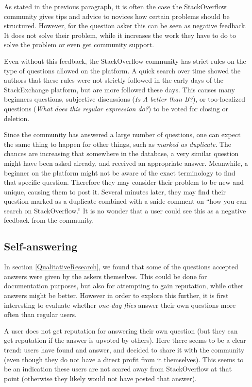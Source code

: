 \documentclass[conference]{IEEEtran}
\newcommand\odf{\emph{one-day flies}\xspace}
\newcommand\ru{regular users\xspace}
\begin{document}
As stated in the previous paragraph, it is often the case the StackOverflow
community gives tips and advice to novices how certain problems should be
structured. However, for the question asker this can be seen as negative
feedback. It does not solve their problem, while it increases the work they
have to do to solve the problem or even get community support.

Even without this feedback, the StackOverflow community has strict rules on the
type of questions allowed on the platform. A quick search over time showed the
authors that these rules were not strictly followed in the early days of the
StackExchange platform, but are more followed these days. This causes many
beginners questions, subjective discussions (\textit{Is A better than B?}), or
too-localized questions (\textit{What does this regular expression do?}) to be
voted for closing or deletion.

Since the community has answered a large number of questions, one can expect
the same thing to happen for other things, such as \textit{marked as
duplicate}. The chances are increasing that somewhere in the database, a very
similar question might have been asked already, and received an appropriate
answer. Meanwhile, a beginner on the platform might not be aware of the exact
terminology to find that specific question. Therefore they may consider their
problem to be new and unique, causing them to post it. Several minutes later,
they may find their question marked as a duplicate combined with a snide
comment on ``how you can search on StackOverflow.'' It is no wonder that a user
could see this as a negative feedback from the community.


\subsection{Self-answering}
In section \ref{QualitativeResearch}, we found that some of the
questions accepted answers were given by the askers themselves. This
could be done for documentation purposes, but also for attempting to gain
reputation, while other answers might be better. However in order to explore
this further, it is first interesting to evaluate whether \odf answer their 
own questions more often than \ru.

A user does not get reputation for answering their own question (but they can
get reputation if the answer is upvoted by others). Here there seems to be a
clear trend: users have found and answer, and decided to share it with the
community (even though they do not have a direct profit from it themselves).
This seems to be an indication these users are not scared away from
StackOverflow at that point (otherwise they likely would not have posted that
answer). 
\end{document}
